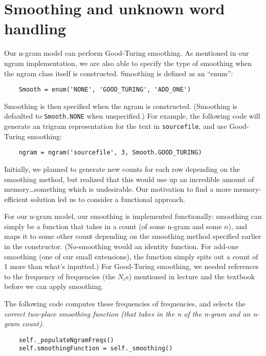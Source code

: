 \documentclass{article}
\begin{document}
\section{Smoothing and unknown word handling}
Our n-gram model can perform Good-Turing smoothing. As mentioned in our ngram implementation, we are also able to specify the type of smoothing when the ngram class itself is constructed. Smoothing is defined as an ``enum'':

{\small\begin{verbatim}
    Smooth = enum('NONE', 'GOOD_TURING', 'ADD_ONE')
\end{verbatim}}

Smoothing is then specified when the ngram is constructed. (Smoothing is defaulted to \texttt{Smooth.NONE} when unspecified.) For example, the following code will generate an trigram representation for the text in \texttt{sourcefile}, and use Good-Turing smoothing:
{\small\begin{verbatim}
    ngram = ngram('sourcefile', 3, Smooth.GOOD_TURING)
\end{verbatim}}

Initially, we planned to generate new counts for each row depending on the smoothing method, but realized that this would use up an incredible amount of memory\ldots something which is undesirable. Our motivation to find a more memory-efficient solution led us to consider a functional approach.\par
For our n-gram model, our smoothing is implemented functionally: smoothing can simply be a function that takes in a count (of some n-gram and some $n$), and maps it to some other count depending on the smoothing method specified earlier in the constructor. (No-smoothing would an identity function. For add-one smoothing (one of our small extensions), the function simply spits out a count of 1 more than what's inputted.) For Good-Turing smoothing, we needed references to the frequency of frequencies (the $N_c$s) mentioned in lecture and the textbook before we can apply smoothing.\par

The following code computes these frequencies of frequencies, and selects the \emph{correct two-place smoothing function (that takes in the \emph{n} of the n-gram and an n-gram count)}.

{\small\begin{verbatim}
    self._populateNgramFreqs()
    self.smoothingFunction = self._smoothing()
\end{verbatim}}
\end{document}
